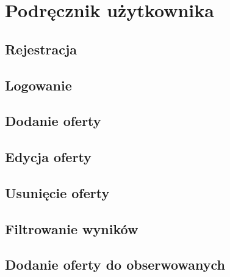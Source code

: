 \chapter{Podręcznik użytkownika}
\label{cha:podrecznik uzytkownika}

\section{Rejestracja}
\label{sec:rejestracja}

\section{Logowanie}
\label{sec:logowanie}

\section{Dodanie oferty}

\section{Edycja oferty}

\section{Usunięcie oferty}

\section{Filtrowanie wyników}

\section{Dodanie oferty do obserwowanych}
